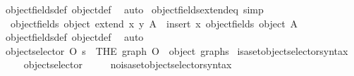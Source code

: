 \begin{isabellebody}
\isamarkupfalse%
\ object{\isacharunderscore}{\kern0pt}fields{\isacharunderscore}{\kern0pt}def\ object{\isacharunderscore}{\kern0pt}def\ \isamarkupfalse%
\ auto%
\endisatagproof
{\isafoldproof}%
%
\isadelimproof
\isanewline
%
\endisadelimproof
\isanewline
{}\isamarkupfalse%
\ object{\isacharunderscore}{\kern0pt}fields{\isacharunderscore}{\kern0pt}extend{\isacharunderscore}{\kern0pt}eq\ {\isacharbrackleft}{\kern0pt}simp{\isacharbrackright}{\kern0pt}{\isacharcolon}{\kern0pt}\isanewline
\ \ {\isachardoublequoteopen}object{\isacharunderscore}{\kern0pt}fields\ {\isacharparenleft}{\kern0pt}object\ {\isacharparenleft}{\kern0pt}extend\ x\ y\ A{\isacharparenright}{\kern0pt}{\isacharparenright}{\kern0pt}\ {\isacharequal}{\kern0pt}\ insert\ x\ {\isacharparenleft}{\kern0pt}object{\isacharunderscore}{\kern0pt}fields\ {\isacharparenleft}{\kern0pt}object\ A{\isacharparenright}{\kern0pt}{\isacharparenright}{\kern0pt}{\isachardoublequoteclose}\isanewline
%
\isadelimproof
\ \ %
\endisadelimproof
%
\isatagproof
{}\isamarkupfalse%
\ object{\isacharunderscore}{\kern0pt}fields{\isacharunderscore}{\kern0pt}def\ object{\isacharunderscore}{\kern0pt}def\ \isamarkupfalse%
\ auto%
\endisatagproof
{\isafoldproof}%
%
\isadelimproof
\isanewline
%
\endisadelimproof
\isanewline
{}\isamarkupfalse%
\ {\isachardoublequoteopen}object{\isacharunderscore}{\kern0pt}selector\ O\ s\ {\isasymequiv}\ {\isacharparenleft}{\kern0pt}THE\ graph{\isachardot}{\kern0pt}\ O\ {\isacharequal}{\kern0pt}\ object\ graph{\isacharparenright}{\kern0pt}{\isacharbackquote}{\kern0pt}s{\isachardoublequoteclose}\isanewline
\isanewline
{}\isamarkupfalse%
\ isa{\isacharunderscore}{\kern0pt}set{\isacharunderscore}{\kern0pt}object{\isacharunderscore}{\kern0pt}selector{\isacharunderscore}{\kern0pt}syntax\isanewline
\ \ \ \isamarkupfalse%
\ object{\isacharunderscore}{\kern0pt}selector\ {\isacharparenleft}{\kern0pt}{\isachardoublequoteopen}{\isacharunderscore}{\kern0pt}{\isacharat}{\kern0pt}{\isacharunderscore}{\kern0pt}{\isachardoublequoteclose}\ {\isacharbrackleft}{\kern0pt}{}{}{}{\isacharcomma}{\kern0pt}\ {}{}{}{}{\isacharbrackright}{\kern0pt}{\isacharparenright}{\kern0pt}\ \isamarkupfalse%
\isanewline
{}\isamarkupfalse%
\ no{\isacharunderscore}{\kern0pt}isa{\isacharunderscore}{\kern0pt}set{\isacharunderscore}{\kern0pt}object{\isacharunderscore}{\kern0pt}selector{\isacharunderscore}{\kern0pt}syntax\isanewline

\end{isabellebody}
